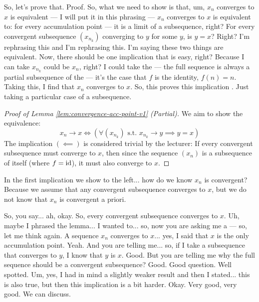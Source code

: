 \begin{spoken-clean}[00:05:04 - 00:06:50]
So, let's prove that. Proof.  So, what we need to show is that, um, $x_n$ converges to $x$ is equivalent — I will put it in this phrasing — $x_n$ converges to $x$ is equivalent to: for every accumulation point — it is a limit of a subsequence, right? For every convergent subsequence $(x_{n_k})$ converging to $y$ for some $y$, is $y = x$? Right? I'm rephrasing this and I'm rephrasing this. I'm saying these two things are equivalent. Now, there should be one implication that is easy, right? Because I can take $x_{n_k}$ could be $x_n$, right? I could take the — the full sequence is always a partial subsequence of the — it's the case that $f$ is the identity, $f(n) = n$. Taking this, I find that $x_n$ converges to $x$. So, this proves this implication . Just taking a particular case of a subsequence.
\end{spoken-clean}


\begin{proof}[Proof of Lemma \ref{lem:convergence-acc-point-v1} (Partial)]
We aim to show the equivalence:
\[ x_n \to x \iff \left( \forall (x_{n_k}) \text{ s.t. } x_{n_k} \to y \implies y = x \right) \]
The implication $(\impliedby)$ is considered trivial by the lecturer:
If every convergent subsequence must converge to $x$, then since the sequence $(x_n)$ is a subsequence of itself (where $f = \operatorname{id}$), it must also converge to $x$.
\end{proof}

\begin{student-interaction}
In the first implication we show to the left... how do we know $x_n$ is convergent? Because we assume that any convergent subsequence converges to $x$, but we do not know that $x_n$ is convergent a priori.
\end{student-interaction}

\begin{spoken-clean}[00:08:16 - 00:09:30]
So, you say... ah, okay. So, every convergent subsequence converges to $x$. Uh, maybe I phrased the lemma... I wanted to... so, now you are asking me a — so, let me think again. A sequence $x_n$ converges to $x$... yes, I said that $x$ is the only accumulation point. Yeah. And you are telling me... so, if I take a subsequence that converges to $y$, I know that $y$ is $x$. Good. But you are telling me why the full sequence should be a convergent subsequence? Good. Good question. Well spotted. Um, yes, I had in mind a slightly weaker result and then I stated... this is also true, but then this implication is a bit harder. Okay. Very good, very good. We can discuss.
\end{spoken-clean}

